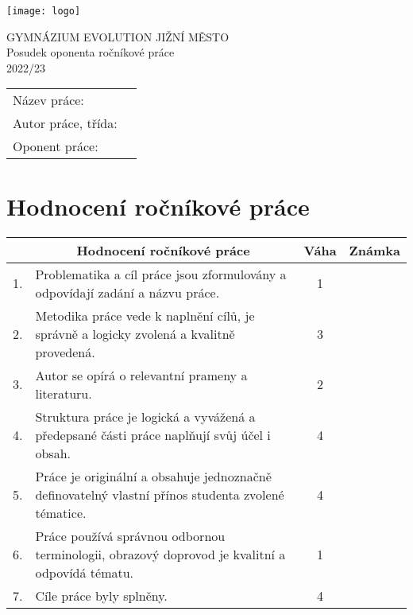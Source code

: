 \documentclass[a4paper,10pt]{article}
\begin{document}
\thispagestyle{fancy}
\begin{minipage}{.3\textwidth}
 \texttt{[image: logo]}
\end{minipage}
\hfill
\begin{minipage}{.69\textwidth}
 \centering
 \Large{\sffamily
  GYMNÁZIUM EVOLUTION JIŽNÍ MĚSTO\\
  Posudek oponenta ročníkové práce\\
  2022/23
 }
\end{minipage}

\begin{center}
 \large{
 \begin{tabular}{ll}
  \textsf{Název práce:} &
  \textsf{
  }\\
  \textsf{Autor práce, třída:} &
  \textsf{
  }\\
  \textsf{Oponent práce:} &
  \textsf{
  }
 \end{tabular}
 }
\end{center}

\section*{\sffamily \centering Hodnocení ročníkové práce}

\begin{center}
 \begin{tabular}{c|m{}|c|c}
  & \multicolumn{1}{c|}{\textsf{Hodnocení ročníkové práce}} & \textsf{Váha} &
  \textsf{Známka}\\
  \toprule
  1. & Problematika a cíl práce jsou zformulovány a odpovídají zadání a názvu
  práce. & 1 &
  \\
  \midrule
  2. & Metodika práce vede k naplnění cílů, je správně a logicky zvolená a
  kvalitně provedená. & 3 &
  \\
  \midrule
  3. & Autor se opírá o relevantní prameny a literaturu. & 2 &
  \\
  \midrule
  4. & Struktura práce je logická a vyvážená a předepsané části práce naplňují
  svůj účel i obsah. & 4 &
  \\
  \midrule
  5. & Práce je originální a obsahuje jednoznačně definovatelný vlastní přínos
  studenta zvolené tématice. & 4 &
  \\
  \midrule
  6. & Práce používá správnou odbornou terminologii, obrazový doprovod je
  kvalitní a odpovídá tématu. & 1 &
  \\
  \midrule
  7. & Cíle práce byly splněny. & 4 &
 \end{tabular}
\end{center}
\end{document}
